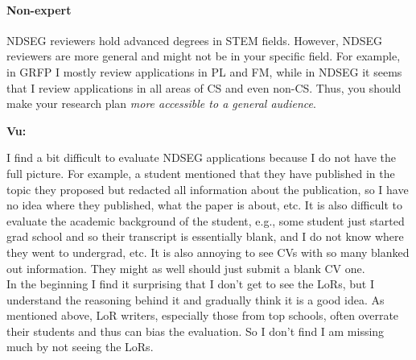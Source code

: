 \documentclass[oneside,11pt,dvipsnames]{book}
\newenvironment{commentbox}[1][]{
  \small
  \begin{mybox}
    {\small \textbf{#1}}
  }{
  \end{mybox}
}
\begin{document}
\paragraph{Non-expert} NDSEG reviewers hold advanced degrees in STEM fields. However, NDSEG reviewers are more general and might not be in your specific field. For example, in GRFP I mostly review applications in PL and FM, while in NDSEG it seems that I review applications in all areas of CS and even non-CS.  Thus, you should make your research plan \emph{more accessible to a general audience}.

\begin{commentbox}[Vu:]
I find a bit difficult to evaluate NDSEG applications because I do not have the full picture.  For example, a student mentioned that they have published in the topic they proposed but redacted all information about the publication, so I have no idea where they published, what the paper is about, etc.  
It is also difficult to evaluate the academic background of the student, e.g., some student just started grad school and so their transcript is essentially blank, and I do not know where they went to undergrad, etc. It is also annoying to see CVs with so many blanked out information. They might as well should just submit a blank CV one. 
\\

In the beginning I find it surprising that I don't get to see the LoRs, but I understand the reasoning behind it and gradually think it is a good idea. As mentioned above, LoR writers, especially those from top schools, often overrate their students and thus can bias the evaluation. So I don't find I am missing much by not seeing the LoRs.
\end{commentbox}
\end{document}
